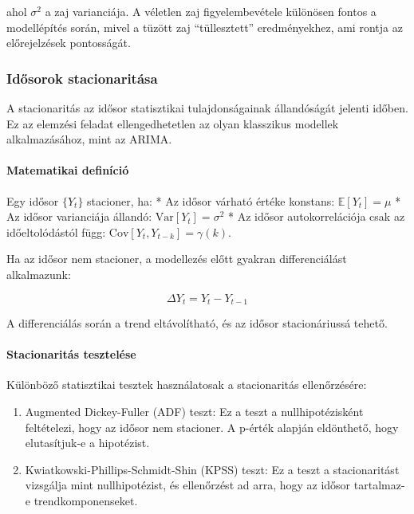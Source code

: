 \documentclass[11pt]{article}
\providecommand{\tightlist}{%
      \setlength{\itemsep}{0pt}\setlength{\parskip}{0pt}}
\begin{document}
ahol \(\sigma^2\) a zaj varianciája. A véletlen zaj figyelembevétele
különösen fontos a modellépítés során, mivel a tüzött zaj
``tüllesztett'' eredményekhez, ami rontja az előrejelzések pontosságát.

    \subsubsection{Idősorok
stacionaritása}\label{idux151sorok-stacionarituxe1sa}

A stacionaritás az idősor statisztikai tulajdonságainak állandóságát
jelenti időben. Ez az elemzési feladat ellengedhetetlen az olyan
klasszikus modellek alkalmazásához, mint az ARIMA.

\paragraph{Matematikai definíció}\label{matematikai-definuxedciuxf3}

Egy idősor \(\{Y_t\}\) stacioner, ha: * Az idősor várható értéke
konstans: \(\mathbb{E}[Y_t] = \mu\) * Az idősor varianciája állandó:
\(\text{Var}[Y_t] = \sigma^2\) * Az idősor autokorrelációja csak az
időeltolódástól függ: \(\text{Cov}[Y_t, Y_{t-k}] = \gamma(k)\).

Ha az idősor nem stacioner, a modellezés előtt gyakran differenciálást
alkalmazunk:

\[\Delta Y_t = Y_t - Y_{t-1}\]

A differenciálás során a trend eltávolítható, és az idősor
stacionáriussá tehető.

\paragraph{Stacionaritás
tesztelése}\label{stacionarituxe1s-teszteluxe9se}

Különböző statisztikai tesztek használatosak a stacionaritás
ellenőrzésére:

\begin{enumerate}
\def\labelenumi{\arabic{enumi}.}
\tightlist
\item
  Augmented Dickey-Fuller (ADF) teszt: Ez a teszt a nullhipotézisként
  feltételezi, hogy az idősor nem stacioner. A p-érték alapján
  eldönthető, hogy elutasítjuk-e a hipotézist.
\item
  Kwiatkowski-Phillips-Schmidt-Shin (KPSS) teszt: Ez a teszt a
  stacionaritást vizsgálja mint nullhipotézist, és ellenőrzést ad arra,
  hogy az idősor tartalmaz-e trendkomponenseket.
\end{enumerate}
\end{document}
